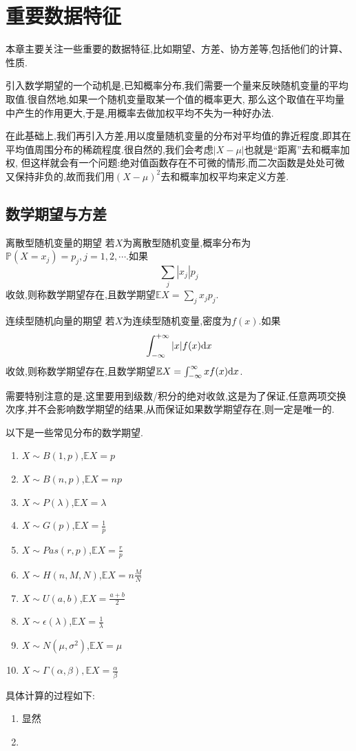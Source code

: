 \chapter{重要数据特征}
本章主要关注一些重要的数据特征,比如期望、方差、协方差等,包括他们的计算、性质.

引入数学期望的一个动机是,已知概率分布,我们需要一个量来反映随机变量的平均取值.很自然地,如果一个随机变量取某一个值的概率更大,
那么这个取值在平均量中产生的作用更大,于是,用概率去做加权平均不失为一种好办法.

在此基础上,我们再引入方差,用以度量随机变量的分布对平均值的靠近程度,即其在平均值周围分布的稀疏程度.很自然的,我们会考虑$|X-\mu|$也就是“距离”去和概率加权,
但这样就会有一个问题:绝对值函数存在不可微的情形,而二次函数是处处可微又保持非负的,故而我们用$(X-\mu)^2$去和概率加权平均来定义方差.

\section{数学期望与方差}
\begin{definition}{离散型随机变量的期望}{}
    若$X$为离散型随机变量,概率分布为$\mathbb{P}(X=x_j)=p_j,j=1,2,\cdots$.如果
    $$\sum_{j}\left|x_j\right|p_j$$
    收敛,则称数学期望存在,且数学期望$\mathbb{E}X=\sum_{j}x_jp_j$.
\end{definition}
\begin{definition}{连续型随机向量的期望}{}
    若$X$为连续型随机变量,密度为$f(x)$.如果
    $$\int_{-\infty}^{+\infty}|x|f(x){\rm d}x$$
    收敛,则称数学期望存在,且数学期望$\mathbb{E}X=\int_{-\infty}^{\infty}xf(x){\rm d}x$.
\end{definition}
需要特别注意的是,这里要用到级数/积分的绝对收敛,这是为了保证,任意两项交换次序,并不会影响数学期望的结果,从而保证如果数学期望存在,则一定是唯一的.

以下是一些常见分布的数学期望.
\begin{enumerate}
    \item $X\sim B(1,p)$,$\mathbb{E}X=p$
    \item $X\sim B(n,p)$,$\mathbb{E}X=np$
    \item $X\sim P(\lambda)$,$\mathbb{E}X=\lambda$
    \item $X\sim G(p)$,$\mathbb{E}X=\frac{1}{p}$
    \item $X\sim Pas(r,p)$,$\mathbb{E}X=\frac{r}{p}$
    \item $X\sim H(n,M,N)$,$\mathbb{E}X=n\frac{M}{N}$
    \item $X\sim U(a,b)$,$\mathbb{E}X=\frac{a+b}{2}$
    \item $X\sim \epsilon(\lambda)$,$\mathbb{E}X=\frac{1}{\lambda}$
    \item $X\sim N(\mu,\sigma^2)$,$\mathbb{E}X=\mu$
    \item $X\sim \Gamma(\alpha,\beta),\mathbb{E}X=\frac{\alpha}{\beta}$
\end{enumerate}
具体计算的过程如下:
\begin{enumerate}
    \item 显然
    \item 
\end{enumerate}


